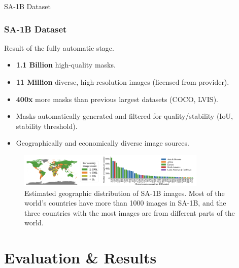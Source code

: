 \documentclass{beamer}
\begin{document}
\begin{frame}{SA-1B Dataset}
    \frametitle{SA-1B Dataset}
    Result of the fully automatic stage.
    \begin{itemize}
        \item \textbf{1.1 Billion} high-quality masks.
        \item \textbf{11 Million} diverse, high-resolution images (licensed from provider).
        \item \textbf{400x} more masks than previous largest datasets (COCO, LVIS).
        \item Masks automatically generated and filtered for quality/stability (IoU, stability threshold).
        \item Geographically and economically diverse image sources.
    \end{itemize}
    \begin{figure}
        \centering
        \includegraphics[width=0.8\textwidth]{figures/source_geography.png}
        \caption{Estimated geographic distribution of SA-1B images. Most of the world's countries have more than 1000 images in
        SA-1B, and the three countries with the most images are from different parts of the world.}
        \label{fig:source_geography}
    \end{figure}
\end{frame}

\section{Evaluation \& Results}
\end{document}
